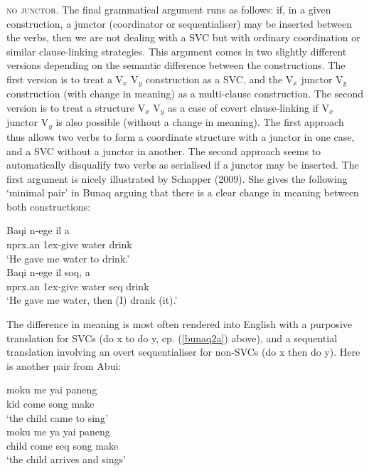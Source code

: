 \textsc{no junctor}. The final grammatical argument runs as follows: if, in a given construction, a junctor (coordinator or sequentialiser) may be inserted between the verbs, then we are not dealing with a SVC but with ordinary coordination or similar clause-linking strategies. This argument comes in two slightly different versions depending on the semantic difference between the constructions. The first version is to treat a V$_x$ V$_y$ construction as a SVC, and the V$_x$ junctor V$_y$ construction (with change in meaning) as a multi-clause construction. The second version is to treat a structure V$_x$ V$_y$ as a case of covert clause-linking if V$_x$ junctor V$_y$ is also possible (without a change in meaning). The first approach thus allows two verbs to form a coordinate structure with a junctor in one case, and a SVC without a junctor in another. The second approach seems to automatically disqualify two verbs as serialised if a junctor may be inserted. The first argument is nicely illustrated by Schapper (2009). She gives the following `minimal pair' in Bunaq arguing that there is a clear change in meaning between both constructions:

\pex 
\a
\gll Baqi n-ege il a \\
\acs{nprx}.\acs{an} \acs{1}\acs{ex}-give water drink \\
\glft ‘He gave me water to drink.’ \\ 
\z
\a
\gla Baqi n-ege il soq, a \\ 
\acs{nprx}.\acs{an} \acs{1}\acs{ex}-give water \acs{seq} drink \\
\glft ‘He gave me water, then (I) drank (it).’ \\ 
\z
\xe

The difference in meaning is most often rendered into English with a purposive translation for SVCs (do x to do y, cp. (\ref{bunaq2a}) above), and a sequential translation involving an overt sequentialiser for non-SVCs (do x then do y). Here is another pair from Abui:

\pex \label{}
\a
\gll moku me yai paneng \\
kid come song make \\
\glft ‘the child came to sing’ \\ 
\z
\a
\gla moku me ya yai paneng \\ 
child come \acs{seq} song make \\
\glft `the child arrives and sings’ \\ 
\z
\xe

